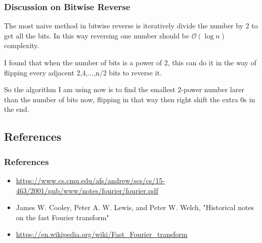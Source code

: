 \documentclass{beamer}
\begin{document}
\begin{frame}
    \frametitle{Discussion on Bitwise Reverse}
    The most naive method in bitwise reverse is iteratively divide the number by 2 to get all the bits. In this way reversing one number should be $\mathcal{O}(\log{n})$ complexity. 

    I found that when the number of bits is a power of 2, this can do it in the way of flipping every adjacent 2,4,...,n/2 bits to reverse it.

    So the algorithm I am using now is to find the smallest 2-power number larer than the number of bits now, flipping in that way then right shift the extra 0s in the end.
	
\end{frame}


\begin{frame}
	\section{References}
	\frametitle{References}
	\begin{itemize}\itemsep .125cm
        \item \url{https://www.cs.cmu.edu/afs/andrew/scs/cs/15-463/2001/pub/www/notes/fourier/fourier.pdf}
        \item James W. Cooley, Peter A. W. Lewis, and Peter W. Welch, "Historical notes on the fast Fourier transform"
        \item \url{https://en.wikipedia.org/wiki/Fast_Fourier_transform}
    \end{itemize}
\end{frame}
\end{document}
